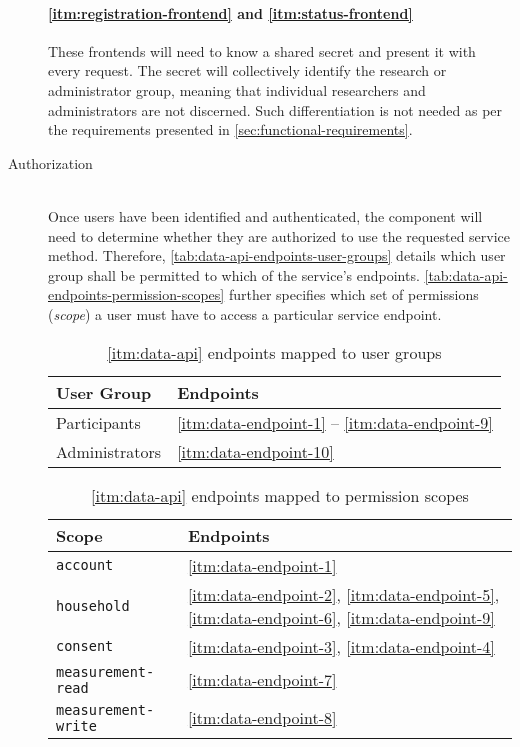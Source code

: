 \begin{description}
  \paragraph{\ref*{itm:registration-frontend} and \ref*{itm:status-frontend}}
  These frontends will need to know a shared secret and present it with every request. The secret will collectively identify the research or administrator group, meaning that individual researchers and administrators are not discerned. Such differentiation is not needed as per the requirements presented in \autoref{sec:functional-requirements}.

  \item[Authorization\label{itm:data-api-authorization}]
  \hfill \\
  Once users have been identified and authenticated, the component will need to determine whether they are authorized to use the requested service method. Therefore, \autoref{tab:data-api-endpoints-user-groups} details which user group shall be permitted to which of the service's endpoints. \autoref{tab:data-api-endpoints-permission-scopes} further specifies which set of permissions (\textit{scope}) a user must have to access a particular service endpoint.

\begin{table}[hbt]
	\centering
  	\begin{tabularx}{\textwidth}{|l|X|}
		\hline
		\textbf{User Group} & \textbf{Endpoints} \\
	    \hline
	    Participants & \ref{itm:data-endpoint-1} -- \ref{itm:data-endpoint-9} \\
		Administrators & \ref{itm:data-endpoint-10} \\
	    	\hline
	\end{tabularx}
  	\caption{\ref*{itm:data-api} endpoints mapped to user groups}
  	\label{tab:data-api-endpoints-user-groups}
\end{table}

\FloatBarrier

\begin{table}[hbt]
	\centering
  	\begin{tabularx}{\textwidth}{|l|X|}
		\hline
		\textbf{Scope} & \textbf{Endpoints} \\
	    \hline
	    \texttt{account} & \ref{itm:data-endpoint-1} \\
		\texttt{household} & \ref{itm:data-endpoint-2}, \ref{itm:data-endpoint-5}, \ref{itm:data-endpoint-6}, \ref{itm:data-endpoint-9} \\
		\texttt{consent} & \ref{itm:data-endpoint-3}, \ref{itm:data-endpoint-4} \\
		\texttt{measurement-read} & \ref{itm:data-endpoint-7} \\
		\texttt{measurement-write} & \ref{itm:data-endpoint-8} \\
	    	\hline
	\end{tabularx}
  	\caption{\ref*{itm:data-api} endpoints mapped to permission scopes}
  	\label{tab:data-api-endpoints-permission-scopes}
\end{table}


\end{description}
